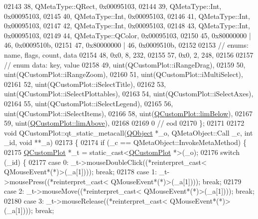 \begin{DoxyCode}
02143       38, QMetaType::QRect, 0x00095103,
02144       39, QMetaType::Int, 0x00095103,
02145       40, QMetaType::Int, 0x00095103,
02146       41, QMetaType::Int, 0x00095103,
02147       42, QMetaType::Int, 0x00095103,
02148       43, QMetaType::Int, 0x00095103,
02149       44, QMetaType::QColor, 0x00095103,
02150       45, 0x80000000 | 46, 0x0009510b,
02151       47, 0x80000000 | 46, 0x0009510b,
02152 
02153  \textcolor{comment}{// enums: name, flags, count, data}
02154       48, 0x0,    8,  232,
02155       57, 0x0,    2,  248,
02156 
02157  \textcolor{comment}{// enum data: key, value}
02158       49, uint(QCustomPlot::iRangeDrag),
02159       50, uint(QCustomPlot::iRangeZoom),
02160       51, uint(QCustomPlot::iMultiSelect),
02161       52, uint(QCustomPlot::iSelectTitle),
02162       53, uint(QCustomPlot::iSelectPlottables),
02163       54, uint(QCustomPlot::iSelectAxes),
02164       55, uint(QCustomPlot::iSelectLegend),
02165       56, uint(QCustomPlot::iSelectItems),
02166       58, uint(\hyperlink{a00116_acf68ae22e9b44e959fc82bc6366e9b8da571c876f0344c894acf3e70b5e1281b7}{QCustomPlot::limBelow}),
02167       59, uint(\hyperlink{a00116_acf68ae22e9b44e959fc82bc6366e9b8da065748f172d5a34ffd1e09924d55cc17}{QCustomPlot::limAbove}),
02168 
02169        0        \textcolor{comment}{// eod}
02170 \};
02171 
02172 \textcolor{keywordtype}{void} QCustomPlot::qt\_static\_metacall(\hyperlink{a00059}{QObject} *\_o, QMetaObject::Call \_c, \textcolor{keywordtype}{int} \_id, \textcolor{keywordtype}{void} **\_a)
02173 \{
02174     \textcolor{keywordflow}{if} (\_c == QMetaObject::InvokeMetaMethod) \{
02175         \hyperlink{a00030_d8/d00/a00186}{QCustomPlot} *\_t = \textcolor{keyword}{static\_cast<}\hyperlink{a00030_d8/d00/a00186}{QCustomPlot} *\textcolor{keyword}{>}(\_o);
02176         \textcolor{keywordflow}{switch} (\_id) \{
02177         \textcolor{keywordflow}{case} 0: \_t->mouseDoubleClick((*\textcolor{keyword}{reinterpret\_cast<} QMouseEvent*(*)\textcolor{keyword}{>}(\_a[1]))); \textcolor{keywordflow}{break};
02178         \textcolor{keywordflow}{case} 1: \_t->mousePress((*\textcolor{keyword}{reinterpret\_cast<} QMouseEvent*(*)\textcolor{keyword}{>}(\_a[1]))); \textcolor{keywordflow}{break};
02179         \textcolor{keywordflow}{case} 2: \_t->mouseMove((*\textcolor{keyword}{reinterpret\_cast<} QMouseEvent*(*)\textcolor{keyword}{>}(\_a[1]))); \textcolor{keywordflow}{break};
02180         \textcolor{keywordflow}{case} 3: \_t->mouseRelease((*\textcolor{keyword}{reinterpret\_cast<} QMouseEvent*(*)\textcolor{keyword}{>}(\_a[1]))); \textcolor{keywordflow}{break};

\end{DoxyCode}
